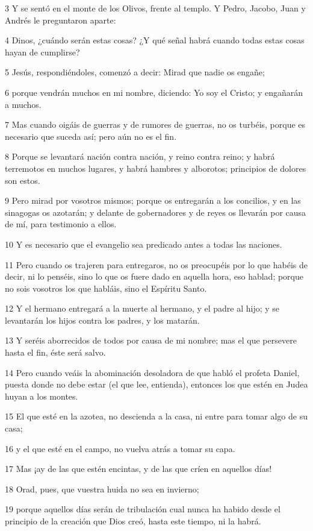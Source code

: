 \par 3 Y se sentó en el monte de los Olivos, frente al templo. Y Pedro, Jacobo, Juan y Andrés le preguntaron aparte:
\par 4 Dinos, ¿cuándo serán estas cosas? ¿Y qué señal habrá cuando todas estas cosas hayan de cumplirse?
\par 5 Jesús, respondiéndoles, comenzó a decir: Mirad que nadie os engañe;
\par 6 porque vendrán muchos en mi nombre, diciendo: Yo soy el Cristo; y engañarán a muchos.
\par 7 Mas cuando oigáis de guerras y de rumores de guerras, no os turbéis, porque es necesario que suceda así; pero aún no es el fin.
\par 8 Porque se levantará nación contra nación, y reino contra reino; y habrá terremotos en muchos lugares, y habrá hambres y alborotos; principios de dolores son estos.
\par 9 Pero mirad por vosotros mismos; porque os entregarán a los concilios, y en las sinagogas os azotarán; y delante de gobernadores y de reyes os llevarán por causa de mí, para testimonio a ellos.
\par 10 Y es necesario que el evangelio sea predicado antes a todas las naciones.
\par 11 Pero cuando os trajeren para entregaros, no os preocupéis por lo que habéis de decir, ni lo penséis, sino lo que os fuere dado en aquella hora, eso hablad; porque no sois vosotros los que habláis, sino el Espíritu Santo.
\par 12 Y el hermano entregará a la muerte al hermano, y el padre al hijo; y se levantarán los hijos contra los padres, y los matarán.
\par 13 Y seréis aborrecidos de todos por causa de mi nombre; mas el que persevere hasta el fin, éste será salvo.
\par 14 Pero cuando veáis la abominación desoladora de que habló el profeta Daniel, puesta donde no debe estar (el que lee, entienda), entonces los que estén en Judea huyan a los montes.
\par 15 El que esté en la azotea, no descienda a la casa, ni entre para tomar algo de su casa;
\par 16 y el que esté en el campo, no vuelva atrás a tomar su capa.
\par 17 Mas ¡ay de las que estén encintas, y de las que críen en aquellos días!
\par 18 Orad, pues, que vuestra huida no sea en invierno;
\par 19 porque aquellos días serán de tribulación cual nunca ha habido desde el principio de la creación que Dios creó, hasta este tiempo, ni la habrá.
